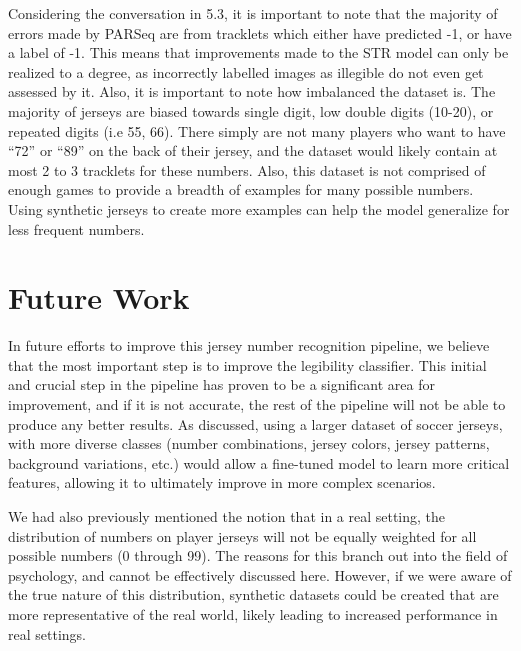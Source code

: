 \documentclass[11pt, letterpaper]{article}
\begin{document}
Considering the conversation in 5.3, it is important to note that the majority of errors made by PARSeq are from tracklets which either have predicted -1, or have a label of -1. This means that improvements made to the STR model can only be realized to a degree, as incorrectly labelled images as illegible do not even get assessed by it. Also, it is important to note how imbalanced the dataset is. The majority of jerseys are biased towards single digit, low double digits (10-20), or repeated digits (i.e 55, 66). There simply are not many players who want to have “72” or “89” on the back of their jersey, and the dataset would likely contain at most 2 to 3 tracklets for these numbers. Also, this dataset is not comprised of enough games to provide a breadth of examples for many possible numbers. Using synthetic jerseys to create more examples can help the model generalize for less frequent numbers.

\section{Future Work}

In future efforts to improve this jersey number recognition pipeline, we believe that the most important step is to improve the legibility classifier. This initial and crucial step in the pipeline has proven to be a significant area for improvement, and if it is not accurate, the rest of the pipeline will not be able to produce any better results. As discussed, using a larger dataset of soccer jerseys, with more diverse classes (number combinations, jersey colors, jersey patterns, background variations, etc.) would allow a fine-tuned model to learn more critical features, allowing it to ultimately improve in more complex scenarios.

We had also previously mentioned the notion that in a real setting, the distribution of numbers on player jerseys will not be equally weighted for all possible numbers (0 through 99). The reasons for this branch out into the field of psychology, and cannot be effectively discussed here. However, if we were aware of the true nature of this distribution, synthetic datasets could be created that are more representative of the real world, likely leading to increased performance in real settings.
\end{document}
